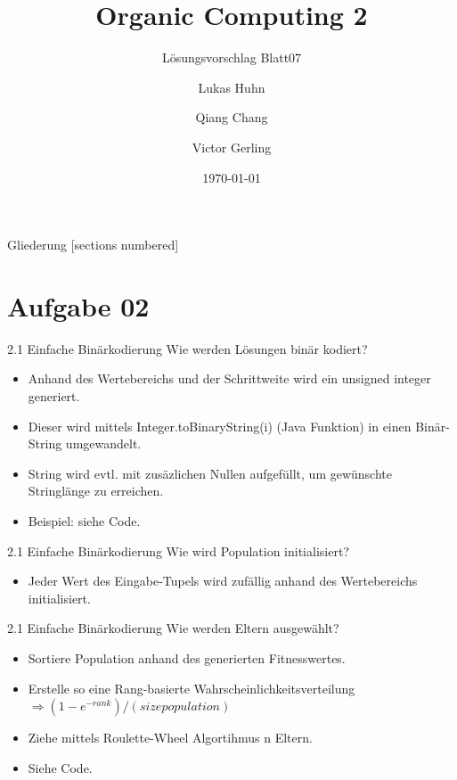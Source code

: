\documentclass{ocbeameruni}
\title{Organic Computing 2}
\subtitle{Lösungsvorschlag Blatt07}
\date{\today}
\author{Lukas Huhn \and Qiang Chang \and Victor Gerling}
\institute{%
  Universität Augsburg\\
  Institut für Informatik\\
  Lehrstuhl für Organic Computing
}
\begin{document}
\maketitle


\begin{frame}{Gliederung}
  [sections numbered]
  \tableofcontents
\end{frame}


\section{Aufgabe 02}

\begin{frame}{2.1 Einfache Binärkodierung}
Wie werden Lösungen binär kodiert? 
    \begin{itemize}
    \item Anhand des Wertebereichs und der Schrittweite wird ein unsigned integer generiert.
    \item Dieser wird mittels Integer.toBinaryString(i) (Java Funktion) in einen Binär-String umgewandelt.
    \item String wird evtl. mit zusäzlichen Nullen aufgefüllt, um gewünschte Stringlänge zu erreichen.
    \item Beispiel: siehe Code.
    \end{itemize}
\end{frame}

\begin{frame}{2.1 Einfache Binärkodierung}
Wie wird Population initialisiert? 
    \begin{itemize}
    \item Jeder Wert des Eingabe-Tupels wird zufällig anhand des Wertebereichs initialisiert.
    \end{itemize}
\end{frame}

\begin{frame}{2.1 Einfache Binärkodierung}
Wie werden Eltern ausgewählt? 
    \begin{itemize}
    \item Sortiere Population anhand des generierten Fitnesswertes.
    \item Erstelle so eine Rang-basierte Wahrscheinlichkeitsverteilung $\Rightarrow (1 - e^{- rank}) / (size population)$
    \item Ziehe mittels Roulette-Wheel Algortihmus n Eltern.
    \item Siehe Code.
    \end{itemize}
\end{frame}
\end{document}

